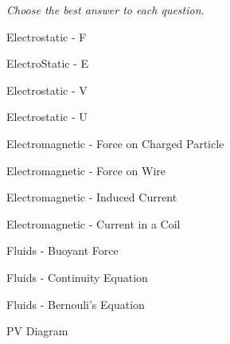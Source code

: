 \documentclass[10pt]{examdesign}
\begin{document}
\begin{multiplechoice}
[title={Multiple Choice},
rearrange=no]
	\textit{Choose the best answer to each question.}
	\begin{question}
		Electrostatic - F
	
	\end{question}

	\begin{question}
		
		ElectroStatic - E
	\end{question}

	\begin{question}
		Electrostatic - V
	 
	\end{question}

	\begin{question}
		Electrostatic - U
	
	\end{question}
	\begin{question}
		
		Electromagnetic - Force on Charged Particle
\end{question}

	\begin{question}
		Electromagnetic - Force on Wire	
	
	\end{question}
\begin{question}
	
		Electromagnetic - Induced Current
	\end{question}

	\begin{question}
		Electromagnetic - Current in a Coil 
	
	\end{question}
	
	\begin{question}
		Fluids - Buoyant Force
	
	\end{question}
	
	\begin{question}
		Fluids - Continuity Equation
	
	\end{question}

	\begin{question}
	 Fluids - Bernouli's Equation
	\end{question}


	\begin{question} 
		PV Diagram
	

\end{question}
\end{multiplechoice}
\end{document}
